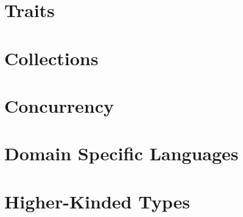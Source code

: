 \part[Traits]{Traits}
\part[Collections]{Collections}
\part[Concurrency]{Concurrency}
\part[DSLs]{Domain Specific Languages}
\part[Higher-Kinded Types]{Higher-Kinded Types}